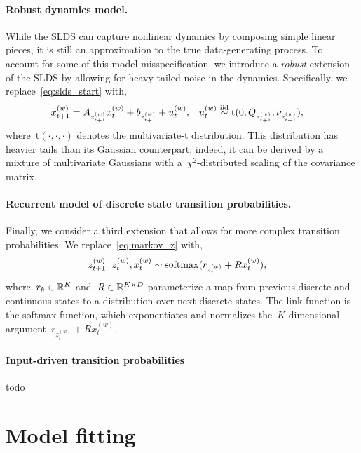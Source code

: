 \documentclass[11pt]{article}
\begin{document}
\paragraph{Robust dynamics model.}  While the SLDS can capture nonlinear
dynamics by composing simple linear pieces, it is still an approximation
to the true data-generating process.  To account for some of this
model misspecification, we introduce a \emph{robust} extension of the
SLDS by allowing for heavy-tailed noise in the dynamics.  Specifically,
we replace~\eqref{eq:slds_start} with,
\begin{align}
  x_{t+1}^{(w)} &= A_{z_{t+1}^{(w)}} x_{t}^{(w)} + b_{z_{t+1}^{(w)}} +  u_t^{(w)},
  &
  u_t^{(w)} &\stackrel{\text{iid}}{\sim} \mathrm{t}(0, Q_{z_{t+1}^{(w)}}, \nu_{z_{t+1}^{(w)}}),
\end{align}
where~$\mathrm{t}(\cdot, \cdot, \cdot)$ denotes the multivariate-t
distribution.  This distribution has heavier tails than its Gaussian
counterpart; indeed, it can be derived by a mixture of multivariate
Gaussians with a~$\chi^2$-distributed scaling of the covariance matrix. 

\paragraph{Recurrent model of discrete state transition probabilities.}
Finally, we consider a third extension that allows for more complex
transition probabilities.  We replace~\eqref{eq:markov_z} with,
\begin{align}
  z_{t+1}^{(w)} \,|\, z_t^{(w)}, x_t^{(w)}
  &\sim \mathrm{softmax}(r_{z_t^{(w)}} + R x_t^{(w)}),
    \label{eq:recurrent}
\end{align}
where~${r_k \in \mathbb{R}^K}$ and~${R \in \mathbb{R}^{K \times D}}$
parameterize a map from previous discrete and continuous states to a
distribution over next discrete states.  The link function is the
softmax function, which exponentiates and normalizes
the~$K$-dimensional argument~${r_{z_t^{(w)}} + R x_t^{(w)}}$.

\paragraph{Input-driven transition probabilities}
todo

\section{Model fitting}
\end{document}
